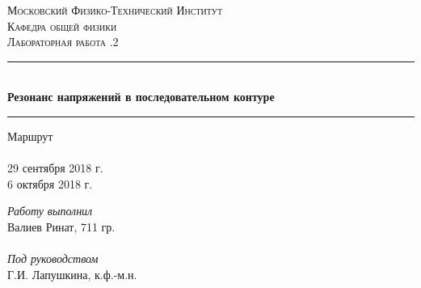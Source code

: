 \begin{titlepage}

\pagestyle{empty}	%

\begin{center}
	\textsc{\LARGE Московский Физико-Технический Институт}\\[1,5cm]
	\textsc{\Large Кафедра общей физики}\\[0,5cm]
	\textsc{\large Лабораторная работа .2}\\[2.5cm]

	\noindent\rule{\textwidth}{1pt}
	\\[0.5cm]
	{ \huge \bfseries Резонанс напряжений в последовательном контуре}
	\\[0.1cm]
	\noindent\rule{\textwidth}{1pt}
\end{center}

\vfill

\begin{minipage}[b]{0.3\textwidth}
	Маршрут \\\\
	29 сентября 2018 г.\\
	6 октября 2018 г.
\end{minipage}
\hfill
\begin{minipage}[b]{0.33\textwidth}
	\textit{Работу выполнил}\\
	Валиев Ринат, 711 гр.\\\\
	\textit{Под руководством}\\
	Г.И. Лапушкина, к.ф.-м.н.
\end{minipage}

\end{titlepage}

\pagestyle{plain}		%
\setcounter{page}{2}	%